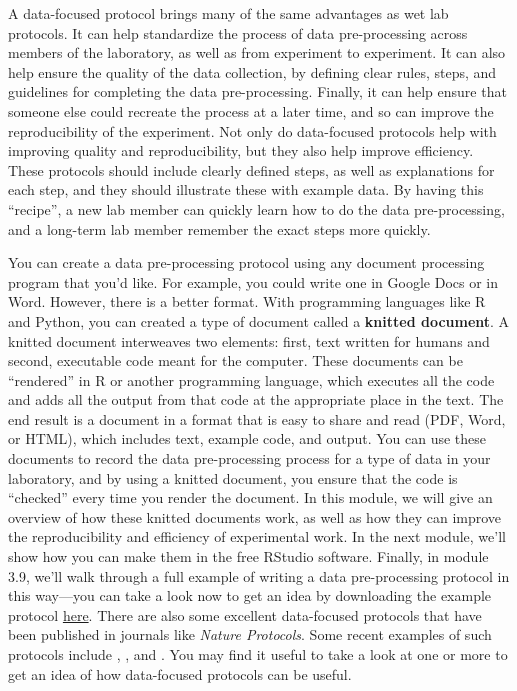 \documentclass[]{tufte-book}
\begin{document}
A data-focused protocol brings many of the same advantages as wet lab protocols.
It can help standardize the process of data pre-processing across members of
the laboratory, as well as from experiment to experiment. It can also help
ensure the quality of the data collection, by defining clear rules,
steps, and guidelines for completing the data pre-processing. Finally, it can
help ensure that someone else could recreate the process at a later time, and
so can improve the reproducibility of the experiment.
Not only do data-focused protocols help with improving quality and reproducibility,
but they also help improve efficiency. These protocols should include
clearly defined steps, as well as explanations for each step, and they should illustrate
these with example data. By having this ``recipe'', a new lab member can quickly
learn how to do the data pre-processing, and a long-term lab member remember
the exact steps more quickly.

You can create a data pre-processing protocol using any document processing
program that you'd like. For example, you could write one in Google Docs or in
Word. However, there is a better format. With programming languages like R and
Python, you can created a type of document called a \textbf{knitted document}. A
knitted document interweaves two elements: first, text written for humans and
second, executable code meant for the computer. These documents can be
``rendered'' in R or another programming language, which executes all the code and
adds all the output from that code at the appropriate place in the text. The end
result is a document in a format that is easy to share and read (PDF, Word, or
HTML), which includes text, example code, and output. You can use these
documents to record the data pre-processing process for a type of data in your
laboratory, and by using a knitted document, you ensure that the code is
``checked'' every time you render the document. In this module,
we will give an overview of how these knitted documents work, as well as how they
can improve the reproducibility and efficiency of experimental work. In the
next module, we'll show how you can make them in the free RStudio software.
Finally, in module 3.9, we'll walk through a full example of writing a data pre-processing
protocol in this way---you can take a look now to get an idea by downloading the
example protocol
\href{https://github.com/geanders/improve_repro/raw/master/data/bactcountr_example_data/example_protocol.pdf}{here}.
There are also some excellent data-focused protocols that have been published in
journals like \emph{Nature Protocols}. Some recent examples of such protocols include
\citet{schrode2021analysis}, \citet{quintelier2021analyzing}, and \citet{majumder2021cognitive}. You
may find it useful to take a look at one or more to get an idea of how
data-focused protocols can be useful.
\end{document}
